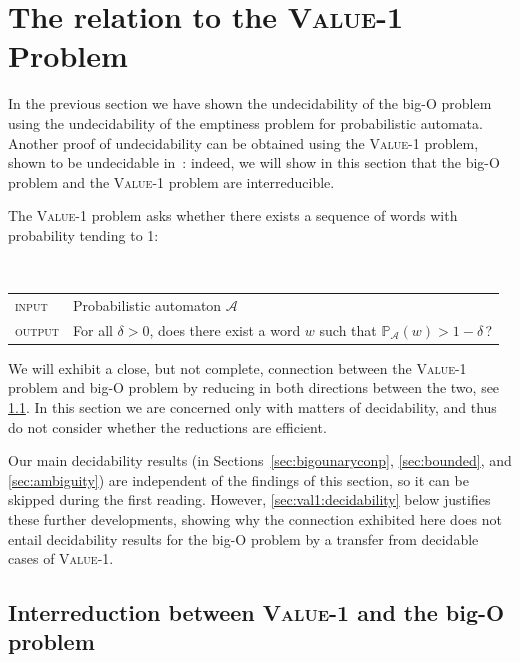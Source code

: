 \documentclass[10pt,a4paper]{amsart}
\numberwithin{equation}{section}
\theoremstyle{plain}
\theoremstyle{definition}
\theoremstyle{remark}
\newcommand\pr{\mathbb{P}}
\begin{document}
\section{The relation to the \textsc{Value-1} Problem}\label{append:rel-val1}

In the previous section we have shown the undecidability of the big-O problem using the undecidability of the emptiness problem for probabilistic automata. Another proof of undecidability can be obtained using the \textsc{Value-1} problem, shown to be undecidable in~\cite{DBLP:conf/icalp/GimbertO10}: indeed, we will show in this section that the big-O problem and the \textsc{Value-1} problem are interreducible.

The \textsc{Value-1} problem asks whether there exists a sequence of words with probability tending to 1:

\medskip

\begin{defi}~\\
\begin{tabular}{ll}
\textsc{input} & Probabilistic automaton $\mathcal{A}$\\
\textsc{output} & For all $\delta > 0$, does there exist a word $w$ such that $\pr_\mathcal{A}(w) > 1-\delta$\,?
\end{tabular}
\end{defi}

\noindent We will exhibit a close, but not complete, connection between the \textsc{Value-1} problem and big-O problem by reducing in both directions between the two, see \cref{sec:val1:interreduction}.
In this section we are concerned only with matters of decidability, and thus do not consider whether the reductions are efficient.

Our main decidability results
(in Sections~\ref{sec:bigounaryconp}, \ref{sec:bounded}, and \ref{sec:ambiguity})
are independent of the findings of this section, so it can be skipped during the first reading.
However, \cref{sec:val1:decidability} below justifies these further developments,
showing why the connection exhibited here
does not entail decidability results for the big-O problem by a transfer
from decidable cases of \textsc{Value-1}.

\pagebreak
\subsection{Interreduction between \textsc{Value-1} and the big-O problem}\label{sec:val1:interreduction}
\end{document}
